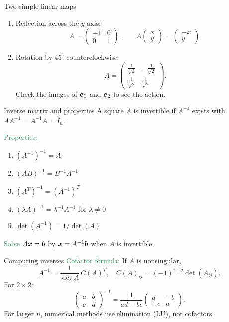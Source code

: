\documentclass[11pt,aspectratio=169]{beamer}
\begin{document}
\begin{frame}{Two simple linear maps}
\begin{enumerate}
\item Reflection across the $y$-axis:
\[
A=\begin{pmatrix}-1&0\\ 0&1\end{pmatrix},\qquad
A\begin{pmatrix}x\\y\end{pmatrix}=\begin{pmatrix}-x\\y\end{pmatrix}.
\]
\item Rotation by $45^\circ$ counterclockwise:
\[
A=\begin{pmatrix}\tfrac{1}{\sqrt{2}}&-\tfrac{1}{\sqrt{2}}\\[2pt]
\tfrac{1}{\sqrt{2}}&\tfrac{1}{\sqrt{2}}\end{pmatrix}.
\]
Check the images of $\boldsymbol e_1$ and $\boldsymbol e_2$ to see the action.
\end{enumerate}
\end{frame}


\begin{frame}{Inverse matrix and properties}
A square $A$ is invertible if $A^{-1}$ exists with $AA^{-1}=A^{-1}A=I_n$.
\bigskip

\textcolor{SeaGreen}{Properties:}
\begin{enumerate}
\item $(A^{-1})^{-1}=A$
\item $(AB)^{-1}=B^{-1}A^{-1}$
\item $(A^T)^{-1}=(A^{-1})^T$
\item $(\lambda A)^{-1}=\lambda^{-1}A^{-1}$ for $\lambda\neq 0$
\item $\det(A^{-1})=1/\det(A)$
\end{enumerate}

\textcolor{SeaGreen}{Solve} $A\boldsymbol x=\boldsymbol b$ by $\boldsymbol x=A^{-1}\boldsymbol b$ when $A$ is invertible.
\end{frame}

\begin{frame}{Computing inverses}
\textcolor{SeaGreen}{Cofactor formula:} If $A$ is nonsingular,
\[
A^{-1}=\frac{1}{\det A}\,C(A)^T,\quad C(A)_{ij}=(-1)^{i+j}\det(A_{ij}).
\]
For $2\times 2$:
\[
\begin{pmatrix}a&b\\ c&d\end{pmatrix}^{-1}
=\frac{1}{ad-bc}\begin{pmatrix}d&-b\\ -c&a\end{pmatrix}.
\]
For larger $n$, numerical methods use elimination (LU), not cofactors.
\end{frame}
\end{document}
